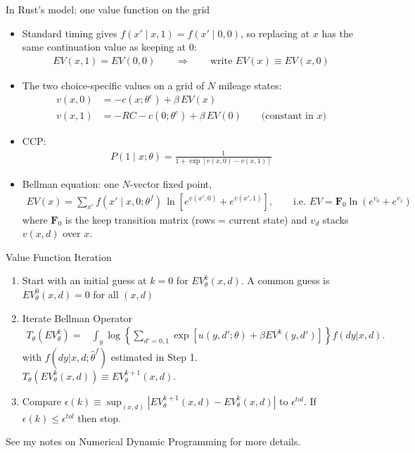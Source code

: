 \documentclass[aspectratio=169,11pt]{beamer}
\begin{document}
\begin{frame}{In Rust's model: one value function on the grid}
\footnotesize
\begin{itemize}
\item Standard timing gives $f(x' \mid x, 1) = f(x' \mid 0, 0)$, so replacing at $x$ has the same continuation value as keeping at $0$:
\begin{align*}
EV(x,1) = EV(0,0) \qquad \Longrightarrow \qquad \text{write } EV(x) \equiv EV(x,0)
\end{align*}
\item The two choice-specific values on a grid of $N$ mileage states:
\begin{align*}
v(x,0) &= -c(x;\theta^c) + \beta\, EV(x)\\
v(x,1) &= -RC - c(0;\theta^c) + \beta\, EV(0) \qquad \text{(constant in } x\text{)}
\end{align*}
\item CCP:
\begin{align*}
P(1 \mid x;\theta) = \frac{1}{1 + \exp\left[v(x,0) - v(x,1)\right]}
\end{align*}
\item Bellman equation: one $N$-vector fixed point,
\begin{align*}
EV(x) = \sum_{x'} f(x' \mid x, 0;\theta^f)\, \ln \left[ e^{v(x',0)} + e^{v(x',1)} \right], \qquad \text{i.e. } EV = \symbf{F}_0 \ln\left(e^{v_0} + e^{v_1}\right)
\end{align*}
where $\symbf{F}_0$ is the keep transition matrix (rows = current state) and $v_d$ stacks $v(x,d)$ over $x$.
\end{itemize}
\end{frame}

\begin{frame}{Value Function Iteration}
\footnotesize
\begin{enumerate}
\item Start with an initial guess at $k=0$ for $EV^{k}_{\theta}(x,d)$. A common guess is $EV_{\theta}^{0}(x,d) = 0$ for all $(x,d)$
\item Iterate Bellman Operator
\begin{align*}
T_{\theta}\left(EV_{\theta}^{k}\right)= & \int_y \log  \left \{ \sum_{d'=0,1} \exp [ u(y, d' ; \theta)  + \beta EV^{k}(y,d')] \right \} f(dy|x,d).
\end{align*}
with $f(dy | x, d; \hat \theta^f)$ estimated in Step 1.\\

$T_{\theta}\left(EV_{\theta}^{k}(x,d)\right)\equiv EV_{\theta}^{k+1}(x,d)$.\\
\item Compare $\epsilon(k) \equiv \sup_{(x,d)} | EV_{\theta}^{k+1}(x,d) - EV_{\theta}^{k}(x,d)|$ to $\epsilon^{tol}$. If $\epsilon(k) \leq \epsilon^{tol}$ then stop.
\end{enumerate}
See my notes on Numerical Dynamic Programming for more details.
\end{frame}
\end{document}
